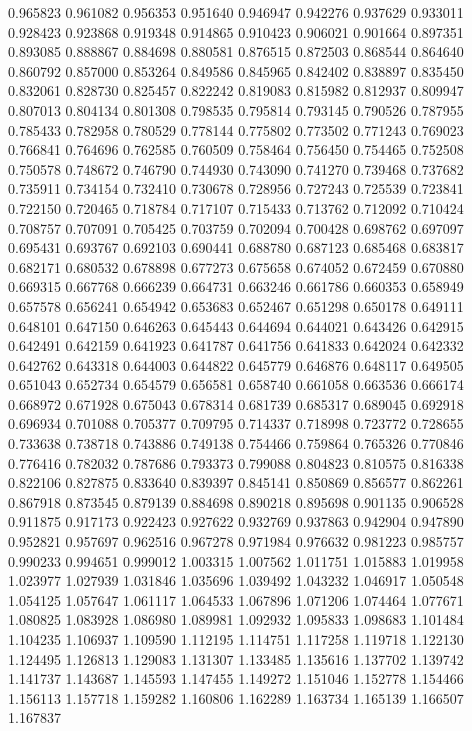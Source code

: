 0.965823
0.961082
0.956353
0.951640
0.946947
0.942276
0.937629
0.933011
0.928423
0.923868
0.919348
0.914865
0.910423
0.906021
0.901664
0.897351
0.893085
0.888867
0.884698
0.880581
0.876515
0.872503
0.868544
0.864640
0.860792
0.857000
0.853264
0.849586
0.845965
0.842402
0.838897
0.835450
0.832061
0.828730
0.825457
0.822242
0.819083
0.815982
0.812937
0.809947
0.807013
0.804134
0.801308
0.798535
0.795814
0.793145
0.790526
0.787955
0.785433
0.782958
0.780529
0.778144
0.775802
0.773502
0.771243
0.769023
0.766841
0.764696
0.762585
0.760509
0.758464
0.756450
0.754465
0.752508
0.750578
0.748672
0.746790
0.744930
0.743090
0.741270
0.739468
0.737682
0.735911
0.734154
0.732410
0.730678
0.728956
0.727243
0.725539
0.723841
0.722150
0.720465
0.718784
0.717107
0.715433
0.713762
0.712092
0.710424
0.708757
0.707091
0.705425
0.703759
0.702094
0.700428
0.698762
0.697097
0.695431
0.693767
0.692103
0.690441
0.688780
0.687123
0.685468
0.683817
0.682171
0.680532
0.678898
0.677273
0.675658
0.674052
0.672459
0.670880
0.669315
0.667768
0.666239
0.664731
0.663246
0.661786
0.660353
0.658949
0.657578
0.656241
0.654942
0.653683
0.652467
0.651298
0.650178
0.649111
0.648101
0.647150
0.646263
0.645443
0.644694
0.644021
0.643426
0.642915
0.642491
0.642159
0.641923
0.641787
0.641756
0.641833
0.642024
0.642332
0.642762
0.643318
0.644003
0.644822
0.645779
0.646876
0.648117
0.649505
0.651043
0.652734
0.654579
0.656581
0.658740
0.661058
0.663536
0.666174
0.668972
0.671928
0.675043
0.678314
0.681739
0.685317
0.689045
0.692918
0.696934
0.701088
0.705377
0.709795
0.714337
0.718998
0.723772
0.728655
0.733638
0.738718
0.743886
0.749138
0.754466
0.759864
0.765326
0.770846
0.776416
0.782032
0.787686
0.793373
0.799088
0.804823
0.810575
0.816338
0.822106
0.827875
0.833640
0.839397
0.845141
0.850869
0.856577
0.862261
0.867918
0.873545
0.879139
0.884698
0.890218
0.895698
0.901135
0.906528
0.911875
0.917173
0.922423
0.927622
0.932769
0.937863
0.942904
0.947890
0.952821
0.957697
0.962516
0.967278
0.971984
0.976632
0.981223
0.985757
0.990233
0.994651
0.999012
1.003315
1.007562
1.011751
1.015883
1.019958
1.023977
1.027939
1.031846
1.035696
1.039492
1.043232
1.046917
1.050548
1.054125
1.057647
1.061117
1.064533
1.067896
1.071206
1.074464
1.077671
1.080825
1.083928
1.086980
1.089981
1.092932
1.095833
1.098683
1.101484
1.104235
1.106937
1.109590
1.112195
1.114751
1.117258
1.119718
1.122130
1.124495
1.126813
1.129083
1.131307
1.133485
1.135616
1.137702
1.139742
1.141737
1.143687
1.145593
1.147455
1.149272
1.151046
1.152778
1.154466
1.156113
1.157718
1.159282
1.160806
1.162289
1.163734
1.165139
1.166507
1.167837
